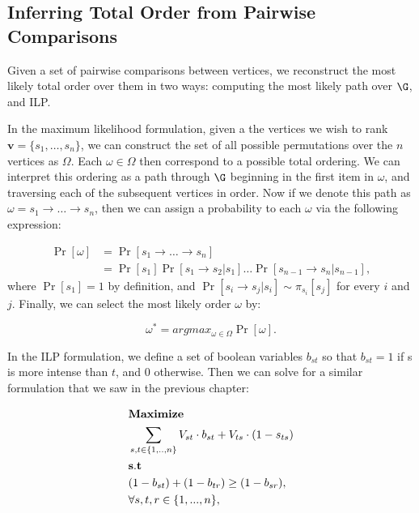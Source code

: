\subsection{Inferring Total Order from Pairwise Comparisons}

Given a set of pairwise comparisons between vertices, we reconstruct the most likely total order over them in two ways: computing the most likely path over $\G$, and ILP. 

In the maximum likelihood formulation, given a the vertices we wish to rank $\pmb v = \{s_1, \ldots, s_n\}$, we can construct the set of all possible permutations over the $n$ vertices as $\Omega$. Each $\omega \in \Omega$ then correspond to a possible total ordering. We can interpret this ordering as a path through $\G$ beginning in the first item in $\omega$, and traversing each of the subsequent vertices in order. Now if we denote this path as $\omega = s_1 \rightarrow \ldots \rightarrow s_n$, then we can assign a probability to each $\omega$ via the following expression:

\begin{align*}
	\Pr[\omega] &= \Pr[s_1 \rightarrow \ldots \rightarrow s_n] \\
			    &= \Pr[s_1] \Pr[s_1 \rightarrow s_2 | s_1] \ldots \Pr[s_{n-1} \rightarrow s_n | s_{n-1}],
\end{align*}
where $\Pr[s_1] = 1$ by definition, and $\Pr[s_i \rightarrow s_j | s_i] \sim \pi_{s_i}[s_j]$ for every $i$ and $j$. Finally, we can select the most likely order $\omega$ by:

\begin{equation}
	\omega^{*} = argmax_{\omega \in \Omega} \Pr[\omega].
\end{equation}


In the ILP formulation, we define a set of boolean variables $b_{st}$ so that $b_{st} = 1$ if s is more intense than $t$, and $0$ otherwise. Then we can solve for a similar formulation that we saw in the previous chapter:

\begin{align*}
  &{\bf Maximize}\\
  &\sum_{s,t \in \{1,..,n\}} V_{st} \cdot b_{st} + V_{ts} \cdot (1 - s_{ts}) \\
  &{\bf s.t}\\
  &(1 - b_{st}) + (1 - b_{tr}) \geq (1 - b_{sr}),  \\
  &\forall s,t,r \in \{1,...,n\},\\
\end{align*}

